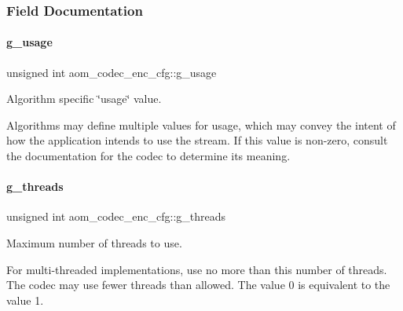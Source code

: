 \subsubsection{Field Documentation}
\mbox{\label{structaom__codec__enc__cfg_a2aef2cdcf97e60ab36f7ca77c028e816}} 
\paragraph{\texorpdfstring{g\+\_\+usage}{g\_usage}}
{\footnotesize\ttfamily unsigned int aom\+\_\+codec\+\_\+enc\+\_\+cfg\+::g\+\_\+usage}



Algorithm specific \char`\"{}usage\char`\"{} value. 

Algorithms may define multiple values for usage, which may convey the intent of how the application intends to use the stream. If this value is non-\/zero, consult the documentation for the codec to determine its meaning. \mbox{\label{structaom__codec__enc__cfg_a55f56f04145e334cfa727df77d8378d4}} 
\paragraph{\texorpdfstring{g\+\_\+threads}{g\_threads}}
{\footnotesize\ttfamily unsigned int aom\+\_\+codec\+\_\+enc\+\_\+cfg\+::g\+\_\+threads}



Maximum number of threads to use. 

For multi-\/threaded implementations, use no more than this number of threads. The codec may use fewer threads than allowed. The value 0 is equivalent to the value 1. \mbox{\label{structaom__codec__enc__cfg_a715cb435d6eaca88eab71a763af3d8ec}} 
